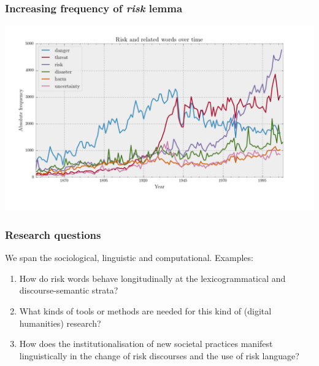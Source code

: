 \documentclass{beamer}       %
\begin{document}
\begin{frame}
    \frametitle{Increasing frequency of \emph{risk} lemma}
    \centering
    \includegraphics[width=1\textwidth]{../../images/risk_related_june_colour}
\end{frame}

\begin{frame}
    \frametitle{Research questions}

    We span the sociological, linguistic and computational. Examples:

    \begin{enumerate}
        \item How do risk words behave longitudinally at the lexicogrammatical and discourse-semantic strata?
        \item What kinds of tools or methods are needed for this kind of (digital humanities) research?
        \item How does the institutionalisation of new societal practices manifest linguistically in the change of risk discourses and the use of risk language?
    \end{enumerate}
\end{frame}
\end{document}
